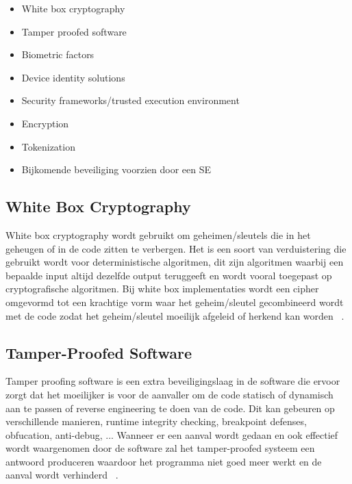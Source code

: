 \begin{itemize}
	\item White box cryptography
	\item Tamper proofed software
	\item Biometric factors
	\item Device identity solutions
	\item Security frameworks/trusted execution environment
	\item Encryption
	\item Tokenization
	\item Bijkomende beveiliging voorzien door een SE
\end{itemize}

\subsection{White Box Cryptography}
White box cryptography wordt gebruikt om geheimen/sleutels die in het geheugen of in de code zitten te verbergen. Het is een soort van verduistering die gebruikt wordt voor deterministische algoritmen, dit zijn algoritmen waarbij een bepaalde input altijd dezelfde output teruggeeft en wordt vooral toegepast op cryptografische algoritmen. Bij white box implementaties wordt een cipher omgevormd tot een krachtige vorm waar het geheim/sleutel gecombineerd wordt met de code zodat het geheim/sleutel moeilijk afgeleid of herkend kan worden ~\autocite{SCA2014}.

\subsection{Tamper-Proofed Software}
Tamper proofing software is een extra beveiligingslaag in de software die ervoor zorgt dat het moeilijker is voor de aanvaller om de code statisch of dynamisch aan te passen of reverse engineering te doen van de code. Dit kan gebeuren op verschillende manieren, runtime integrity checking, breakpoint defenses,  obfucation, anti-debug, ... Wanneer er een aanval wordt gedaan en ook effectief wordt waargenomen door de software zal het tamper-proofed systeem een antwoord produceren waardoor het programma niet goed meer werkt en de aanval wordt verhinderd ~\autocite{SCA2014}.

